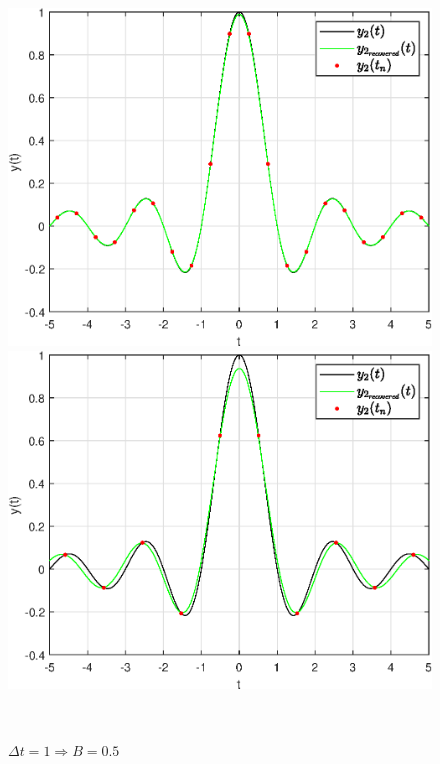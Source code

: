 \documentclass[a4paper]{article}
\begin{document}
\begin{figure}[H]
    \begin{minipage}{0.5\textwidth}
        \centering \includegraphics[width=\textwidth]{graphs2/T_50_dt_0.5_B_1_dv_0.02/func2_recovered.eps}
        \caption{$\Delta t = 0.5 \Rightarrow B = 1$}
    \end{minipage}\hfill
    \begin{minipage}{0.5\textwidth}
        \centering \includegraphics[width=\textwidth]{graphs2/T_50_dt_1_B_0.5_dv_0.02/func2_recovered.eps}
        \caption{$\Delta t = 1 \Rightarrow B = 0.5$}
    \end{minipage}\\[1em]
\end{figure}\noindent\
\end{document}
